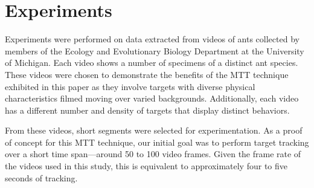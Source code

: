 \documentclass{article}
\begin{document}









\section{Experiments}
\hspace{18pt} Experiments were performed on data extracted from videos of ants collected by members of the Ecology and Evolutionary Biology Department at the University of Michigan. Each video shows a number of specimens of a distinct ant species. These videos were chosen to demonstrate the benefits of the MTT technique exhibited in this paper as they involve targets with diverse physical characteristics filmed moving over varied backgrounds. Additionally, each video has a different number and density of targets that display distinct behaviors.

From these videos, short segments were selected for experimentation. As a proof of concept for this MTT technique, our initial goal was to perform target tracking over a short time span---around 50 to 100 video frames. Given the frame rate of the videos used in this study, this is equivalent to approximately four to five seconds of tracking.
\end{document}
